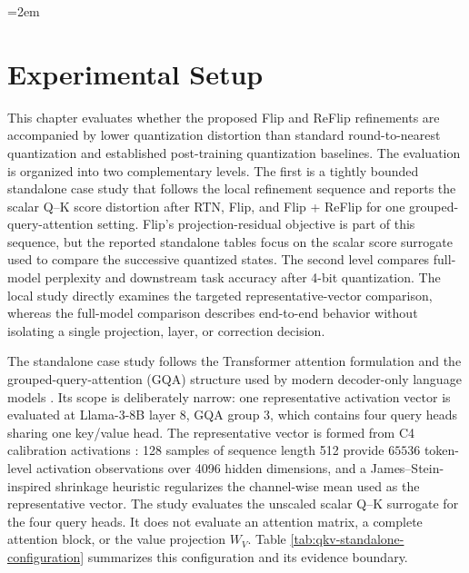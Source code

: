 \documentclass[../main.tex]{subfiles}
\begin{document}
\begingroup
\emergencystretch=2em

\section{Experimental Setup}

This chapter evaluates whether the proposed Flip and ReFlip refinements are accompanied by lower quantization distortion than standard round-to-nearest quantization and established post-training quantization baselines. The evaluation is organized into two complementary levels. The first is a tightly bounded standalone case study that follows the local refinement sequence and reports the scalar Q--K score distortion after RTN, Flip, and Flip + ReFlip for one grouped-query-attention setting. Flip's projection-residual objective is part of this sequence, but the reported standalone tables focus on the scalar score surrogate used to compare the successive quantized states. The second level compares full-model perplexity and downstream task accuracy after 4-bit quantization. The local study directly examines the targeted representative-vector comparison, whereas the full-model comparison describes end-to-end behavior without isolating a single projection, layer, or correction decision.

The standalone case study follows the Transformer attention formulation \cite{vaswani2017attention} and the grouped-query-attention (GQA) structure used by modern decoder-only language models \cite{ainslie2023gqa}. Its scope is deliberately narrow: one representative activation vector is evaluated at Llama-3-8B layer 8, GQA group 3, which contains four query heads sharing one key/value head. The representative vector is formed from C4 calibration activations \cite{raffel2020t5}: 128 samples of sequence length 512 provide $65536$ token-level activation observations over 4096 hidden dimensions, and a James--Stein-inspired shrinkage heuristic \cite{james1961estimation} regularizes the channel-wise mean used as the representative vector. The study evaluates the unscaled scalar Q--K surrogate for the four query heads. It does not evaluate an attention matrix, a complete attention block, or the value projection $W_V$. Table \ref{tab:qkv-standalone-configuration} summarizes this configuration and its evidence boundary.
\end{document}
